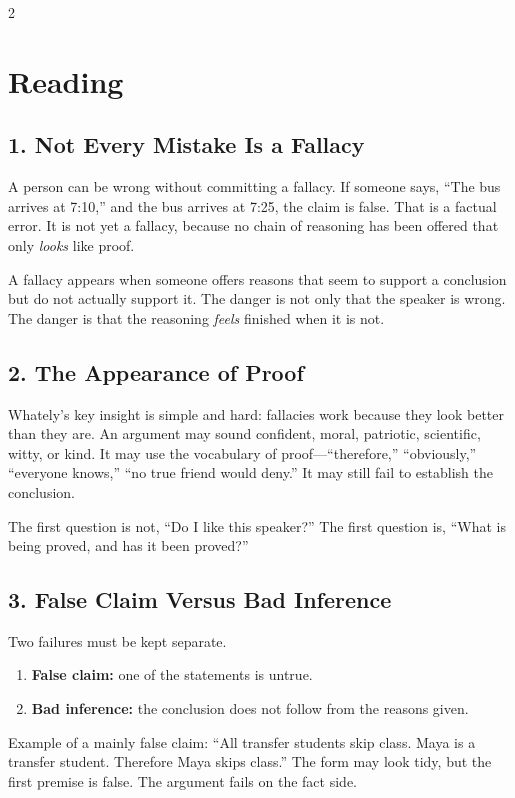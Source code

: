\documentclass[12pt]{article}
\begin{document}
\begin{multicols}{2}
\section*{Reading}

\subsection*{1. Not Every Mistake Is a Fallacy}
A person can be wrong without committing a fallacy. If someone says, ``The bus arrives at 7:10,'' and the bus arrives at 7:25, the claim is false. That is a factual error. It is not yet a fallacy, because no chain of reasoning has been offered that only \textit{looks} like proof.

A fallacy appears when someone offers reasons that seem to support a conclusion but do not actually support it. The danger is not only that the speaker is wrong. The danger is that the reasoning \textit{feels} finished when it is not.

\subsection*{2. The Appearance of Proof}
Whately's key insight is simple and hard: fallacies work because they look better than they are. An argument may sound confident, moral, patriotic, scientific, witty, or kind. It may use the vocabulary of proof---``therefore,'' ``obviously,'' ``everyone knows,'' ``no true friend would deny.'' It may still fail to establish the conclusion.

The first question is not, ``Do I like this speaker?'' The first question is, ``What is being proved, and has it been proved?''

\subsection*{3. False Claim Versus Bad Inference}
Two failures must be kept separate.

\begin{enumerate}[leftmargin=*,itemsep=0.12em]
\item \textbf{False claim:} one of the statements is untrue.
\item \textbf{Bad inference:} the conclusion does not follow from the reasons given.
\end{enumerate}

Example of a mainly false claim: ``All transfer students skip class. Maya is a transfer student. Therefore Maya skips class.'' The form may look tidy, but the first premise is false. The argument fails on the fact side.


\end{multicols}
\end{document}
